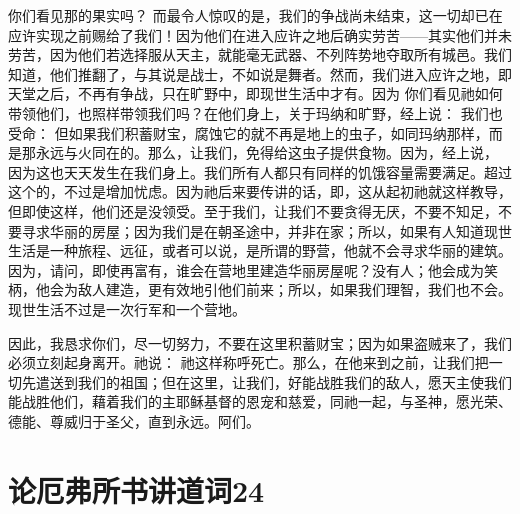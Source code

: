 你们看见那的果实吗？ 而最令人惊叹的是，我们的争战尚未结束，这一切却已在应许实现之前赐给了我们！因为他们在进入应许之地后确实劳苦——其实他们并未劳苦，因为他们若选择服从天主，就能毫无武器、不列阵势地夺取所有城邑。我们知道，他们推翻了，与其说是战士，不如说是舞者。然而，我们进入应许之地，即天堂之后，不再有争战，只在旷野中，即现世生活中才有。因为  你们看见祂如何带领他们，也照样带领我们吗？在他们身上，关于玛纳和旷野，经上说： 我们也受命： 但如果我们积蓄财宝，腐蚀它的就不再是地上的虫子，如同玛纳那样，而是那永远与火同在的。那么，让我们，免得给这虫子提供食物。因为，经上说， 因为这也天天发生在我们身上。我们所有人都只有同样的饥饿容量需要满足。超过这个的，不过是增加忧虑。因为祂后来要传讲的话，即，这从起初祂就这样教导，但即使这样，他们还是没领受。至于我们，让我们不要贪得无厌，不要不知足，不要寻求华丽的房屋；因为我们是在朝圣途中，并非在家；所以，如果有人知道现世生活是一种旅程、远征，或者可以说，是所谓的野营，他就不会寻求华丽的建筑。因为，请问，即使再富有，谁会在营地里建造华丽房屋呢？没有人；他会成为笑柄，他会为敌人建造，更有效地引他们前来；所以，如果我们理智，我们也不会。现世生活不过是一次行军和一个营地。\par

因此，我恳求你们，尽一切努力，不要在这里积蓄财宝；因为如果盗贼来了，我们必须立刻起身离开。祂说： 祂这样称呼死亡。那么，在他来到之前，让我们把一切先遣送到我们的祖国；但在这里，让我们，好能战胜我们的敌人，愿天主使我们能战胜他们，藉着我们的主耶稣基督的恩宠和慈爱，同祂一起，与圣神，愿光荣、德能、尊威归于圣父，直到永远。阿们。\par



\section{论厄弗所书讲道词24}


